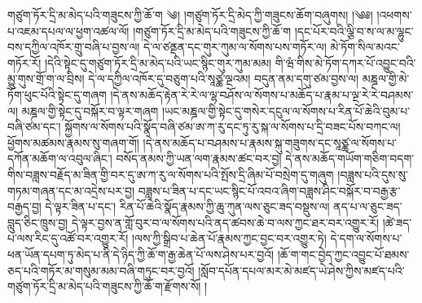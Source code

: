 གཙུག་ཏོར་དྲི་མ་མེད་པའི་གཟུངས་ཀྱི་ཆོ་ག ༄། །གཙུག་ཏོར་དྲི་མེད་ཀྱི་གཟུངས་ཆོག་བཞུགས། །༄༅། །འཕགས་པ་འཇམ་དཔལ་ལ་ཕྱག་འཚལ་ལོ། །གཙུག་ཏོར་དྲི་མ་མེད་པའི་གཟུངས་ཀྱི་ཆོ་ག །དང་པོར་བའི་ལྕི་བ་ས་ལ་མ་ལྷུང་བས་དཀྱིལ་འཁོར་གྲུ་བཞི་པ་བྱས་ལ། དེ་ལ་ཙནྡན་དང་གུར་ཀུམ་ལ་སོགས་པས་གཏོར་ལ། མེ་ཏོག་སིལ་མའང་གཏོར་རོ། །དེའི་སྟེང་དུ་གཙུག་ཏོར་དྲི་མ་མེད་པའི་ཡང་སྙིང་གུར་ཀུམ་མམ། གི་ཝཾ་གིས་མེ་ཏོག་དཀར་པོ་འབྱུང་བའི་མྱུ་གུས་གྲོ་ག་ལ་བྲིས། དེ་ལ་དཀྱིལ་འཁོར་དུ་བཅུག་པའི་སཱཙྪ་ལྔའམ། བདུན་ནམ་དགུ་ཙམ་བྱས་ལ། མཎྜལ་གྱི་མེ་ཏོག་ཕུང་པོའི་སྟེང་དུ་གཞག །དེ་ནས་མཆོད་རྟེན་རེ་རེ་ལ་ལྷ་བཤོས་ལ་སོགས་པ་མཆོད་པ་རྣམ་པ་ལྔ་རེ་རེ་བཤམས་ལ། མཎྜལ་གྱི་སྟེང་དུ་བསྐོར་བ་ལྟར་གཞག །ཡང་མཎྜལ་གྱི་སྟེང་དུ་གསེར་དངུལ་ལ་སོགས་པ་རིན་པོ་ཆེའི་བུམ་པ་བཞི་ཙམ་དང་། སྐྱོགས་ལ་སོགས་པའི་སྣོད་བཞི་ཙམ་ཨ་ཀ་རུ་དང་ཏུ་རུ་སྐ་ལ་སོགས་པ་དྲི་བཟང་པོས་བཀང་ལ། ཕྱོགས་མཚམས་རྣམས་སུ་གཞག་གོ། །དེ་ནས་མཆོད་པ་བཤམས་པ་རྣམས་སྐུ་གཟུགས་དང་སཱཙྪ་ལ་སོགས་པ་དཀོན་མཆོག་ལ་འབུལ་ཞིང་། བསོད་ནམས་ཀྱི་ཡན་ལག་རྣམས་ཚང་བར་བྱ། དེ་ནས་མཆོད་གཡོག་གཅིག་བདག་གིས་བཟླས་བརྗོད་མ་ཟིན་གྱི་བར་དུ་ཨ་ཀ་རུ་ལ་སོགས་པའི་སྤོས་དྲི་ཞིམ་པོ་བསྲེག་དུ་གཞུག །བཟླས་པའི་དུས་སུ་གཏམ་གཞན་དང་མ་འདྲེས་པར་བྱ། བཟླས་པ་ཟིན་པ་དང་ཡང་སྙིང་པོ་འབའ་ཞིག་བཟླས་ཤིང་བསྐོར་བ་བརྒྱ་རྩ་བརྒྱད་བྱ། དེ་ལྟར་ཟིན་པ་དང་། རིན་པོ་ཆེའི་སྣོད་རྣམས་ཀྱི་ཆུ་ཀུན་ལས་ཅུང་ཟད་བསྡུས་ལ། ནད་པ་ལ་ཅུང་ཟད་བླུད་ཅིང་ཁྲུས་བྱ། དེ་ལྟར་བྱས་ན་གློ་བུར་བ་ལ་སོགས་པའི་ནད་ཚབས་ཆེ་བ་ལས་ཀྱང་ཐར་བར་འགྱུར་རོ། །ཚེ་ཟད་པ་ལས་རིང་དུ་འཚོ་བར་འགྱུར་རོ། །ལས་ཀྱི་སྒྲིབ་པ་ཆེན་པོ་རྣམས་ཀྱང་བྱང་བར་འགྱུར་ཏེ། དེ་དག་ལ་སོགས་པ་ཕན་ཡོན་དཔག་ཏུ་མེད་པ་ནི་དེ་ཉིད་ཀྱི་ཆོ་ག་རྒྱ་ཆེན་པོ་ལས་ཤེས་པར་བྱའོ། །ཆོ་ག་གང་བྱེད་ཀྱང་འབྱུང་པོ་ཐམས་ཅད་པའི་གཏོར་མ་གསུམ་མམ་བཞི་གཏུང་བར་བྱའོ། །སློབ་དཔོན་དཔལ་མར་མེ་མཛད་ཡེ་ཤེས་ཀྱིས་མཛད་པའི་གཙུག་ཏོར་དྲི་མ་མེད་པའི་གཟུངས་ཀྱི་ཆོ་ག་རྫོགས་སོ། །